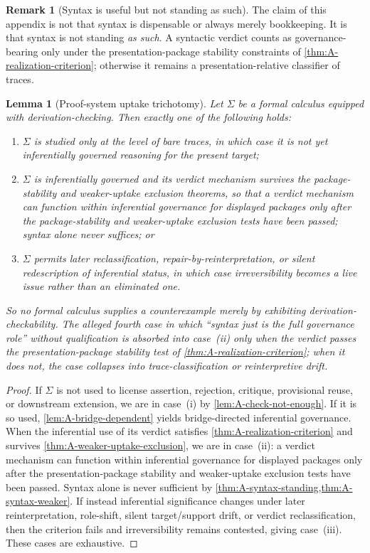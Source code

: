 \documentclass[11pt]{article}
\theoremstyle{plain}
\newtheorem{lemma}[theorem]{Lemma}
\theoremstyle{definition}
\newtheorem{remark}[theorem]{Remark}
\begin{document}
\begin{remark}[Syntax is useful but not standing as such]
The claim of this appendix is not that syntax is dispensable or always merely bookkeeping. It is that syntax is not standing \emph{as such}. A syntactic verdict counts as governance-bearing only under the presentation-package stability constraints of \cref{thm:A-realization-criterion}; otherwise it remains a presentation-relative classifier of traces.
\end{remark}

\begin{lemma}[Proof-system uptake trichotomy]
\label{lem:A-formalist-trichotomy}
Let $\Sigma$ be a formal calculus equipped with derivation-checking. Then exactly one of the following holds:
\begin{enumerate}[label=(\roman*), leftmargin=2.5em]
    \item $\Sigma$ is studied only at the level of bare traces, in which case it is not yet inferentially governed reasoning for the present target;
    \item $\Sigma$ is inferentially governed and its verdict mechanism survives the package-stability and weaker-uptake exclusion theorems, so that a verdict mechanism can function within inferential governance for displayed packages only after the package-stability and weaker-uptake exclusion tests have been passed; syntax alone never suffices; or
    \item $\Sigma$ permits later reclassification, repair-by-reinterpretation, or silent redescription of inferential status, in which case irreversibility becomes a live issue rather than an eliminated one.
\end{enumerate}
So no formal calculus supplies a counterexample merely by exhibiting derivation-checkability. The alleged fourth case in which ``syntax just is the full governance role'' without qualification is absorbed into case~(ii) only when the verdict passes the presentation-package stability test of \cref{thm:A-realization-criterion}; when it does not, the case collapses into trace-classification or reinterpretive drift.
\end{lemma}

\begin{proof}
If $\Sigma$ is not used to license assertion, rejection, critique, provisional reuse, or downstream extension, we are in case~(i) by \cref{lem:A-check-not-enough}. If it is so used, \cref{lem:A-bridge-dependent} yields bridge-directed inferential governance. When the inferential use of its verdict satisfies \cref{thm:A-realization-criterion} and survives \cref{thm:A-weaker-uptake-exclusion}, we are in case~(ii): a verdict mechanism can function within inferential governance for displayed packages only after the presentation-package stability and weaker-uptake exclusion tests have been passed. Syntax alone is never sufficient by \cref{thm:A-syntax-standing,thm:A-syntax-weaker}. If instead inferential significance changes under later reinterpretation, role-shift, silent target/support drift, or verdict reclassification, then the criterion fails and irreversibility remains contested, giving case~(iii). These cases are exhaustive.
\end{proof}
\end{document}
